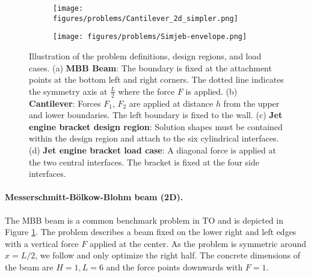 \begin{figure*}[ht!]
\centering
\begin{subfigure}[t]{0.24\textwidth}
    \centering
    \else %
        \hspace*{-0.5cm}
    \fi
    \caption{}%
    \label{fig:beam_def}
\end{subfigure}
\hfill
\begin{subfigure}[t]{0.24\textwidth}
    \centering
    \texttt{[image: figures/problems/Cantilever\_2d\_simpler.png]}
    \caption{}%
    \label{fig:cantilever_def}
\end{subfigure}
\hfill
\begin{subfigure}[t]{0.24\textwidth}
    \centering
    \texttt{[image: figures/problems/Simjeb-envelope.png]}
    \caption{}%
    \label{fig:simjeb_env}
\end{subfigure}
\hfill
\begin{subfigure}[t]{0.24\textwidth}
    \centering
    \caption{}%
    \label{fig:simjeb_def}
\end{subfigure}

\caption{Illustration of the problem definitions, design regions, and load cases.
(a) \textbf{MBB Beam}: The boundary is fixed at the attachment points at the bottom left and right corners. The dotted line indicates the symmetry axis at $\frac{L}{2}$ where the force $F$ is applied.
(b) \textbf{Cantilever}: Forces $F_1$, $F_2$ are applied at distance $h$ from the upper and lower boundaries. The left boundary is fixed to the wall.
(c) \textbf{Jet engine bracket design region}: Solution shapes must be contained within the design region and attach to the six cylindrical interfaces.
(d) \textbf{Jet engine bracket load case}: A diagonal force is applied at the two central interfaces. The bracket is fixed at the four side interfaces.
}
\label{fig:problem_defs}
\end{figure*}




\paragraph{Messerschmitt-Bölkow-Blohm beam (2D).}
The MBB beam is a common benchmark problem in TO and is depicted in Figure \ref{fig:beam_def}. The problem describes a beam fixed on the lower right and left edges with a vertical force $F$ applied at the center. As the problem is symmetric around $x=L/2$, we follow \citet{multi_TO_Papadopoulos_2021} and only optimize the right half. \newline
The concrete dimensions of the beam are $H=1, L=6$ and the force points downwards with $F=1$. 

